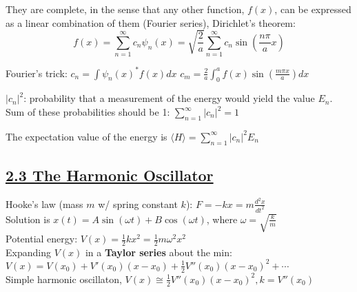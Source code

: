 


They are complete, in the sense that any other function, $f(x)$, can be expressed as a linear combination of them (Fourier series), Dirichlet's theorem:
    $$f(x) = \sum_{n=1}^{\infty} c_n \psi_n(x) = \sqrt{\frac{2}{a}} \sum_{n=1}^{\infty} c_n \sin(\frac{n \pi}{a} x)$$

Fourier's trick: $c_n = \int \psi_n(x)^* f(x) dx$
$c_m = \frac{2}{a} \int_0^a f(x) \sin(\frac{m \pi x}{a}) dx$

$|c_n|^2$: probability that a measurement of the energy would yield the value $E_n$. \\

Sum of these probabilities should be 1: $\sum_{n=1}^{\infty} |c_n|^2 = 1$

The expectation value of the energy is $\langle H \rangle = \sum_{n=1}^{\infty} |c_n|^2 E_n$

\subsection{\underline{2.3 The Harmonic Oscillator}}
Hooke's law (mass $m$ w/ spring constant $k$): $F = -kx = m \frac{d^2 x}{d t^2}$ \\
Solution is $x(t) = A \sin(\omega t) + B \cos(\omega t)$, where $\omega = \sqrt{\frac{k}{m}}$ \\
Potential energy: $V(x) = \frac{1}{2} k x^2 = \frac{1}{2} m \omega^2 x^2$ \\

Expanding $V(x)$ in a \textbf{Taylor series} about the min: $V(x) = V(x_0) + V'(x_0) (x - x_0) + \frac{1}{2} V''(x_0)(x- x_0)^2 + \cdots$ \\
Simple harmonic oscillaton, $V(x) \cong \frac{1}{2} V''(x_0) (x - x_0)^2, k = V''(x_0)$


